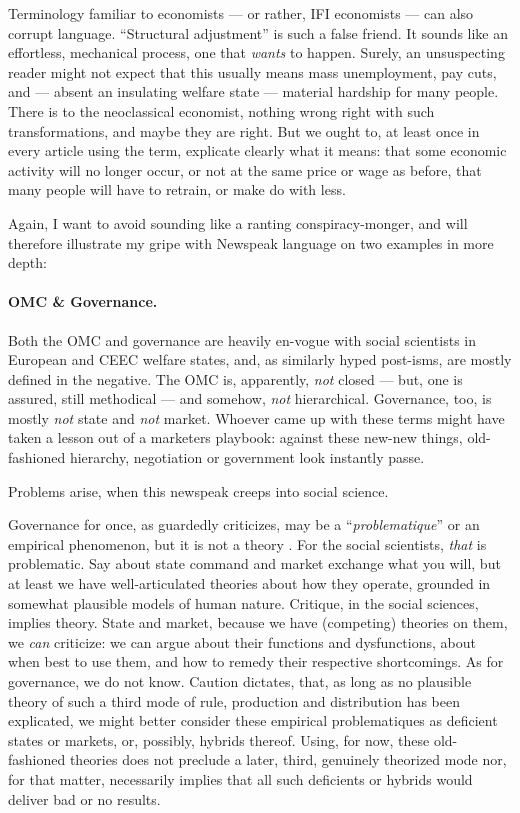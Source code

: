 Terminology familiar to economists --- or rather, \gls{IFI} economists --- can also corrupt language.
``Structural adjustment'' \citep[for example,][19]{Begg2008} is such a false friend.
It sounds like an effortless, mechanical process, one that \emph{wants} to happen.
Surely, an unsuspecting reader might not expect that this usually means mass unemployment, pay cuts, and --- absent an insulating welfare state --- material hardship for many people.
There is to the neoclassical economist, nothing wrong right with such transformations, and maybe they are right.
But we ought to, at least once in every article using the term, explicate clearly what it means:
that some economic activity will no longer occur, or not at the same price or wage as before, that many people will have to retrain, or make do with less.

Again, I want to avoid sounding like a ranting conspiracy-monger, and will therefore illustrate my gripe with Newspeak language on two examples in more depth:

\paragraph{\gls{OMC} \& Governance.} Both the \gls{OMC} and governance are heavily en-vogue with social scientists in European and \gls{CEEC} welfare states, and, as similarly hyped post-isms, are mostly defined in the negative.
The \gls{OMC} is, apparently, \emph{not} closed --- but, one is assured, still methodical --- and somehow, \emph{not} hierarchical.
Governance, too, is mostly \emph{not} state and \emph{not} market.
Whoever came up with these terms might have taken a lesson out of a marketers playbook:
against these new-new things, old-fashioned hierarchy, negotiation or government look instantly passe.

Problems arise, when this newspeak creeps into social science.

Governance for once, as \citeauthor{Jachtenfuchs2001} guardedly criticizes, may be a ``\emph{problematique}'' or an empirical phenomenon, but it is not a theory \citeyearpar[259]{Jachtenfuchs2001}.
For the social scientists, \emph{that} is problematic.
Say about state command and market exchange what you will, but at least we have well-articulated theories about how they operate, grounded in somewhat plausible models of human nature.
Critique, in the social sciences, implies theory.
State and market, because we have (competing) theories on them, we \emph{can} criticize:
we can argue about their functions and dysfunctions, about when best to use them, and how to remedy their respective shortcomings.
As for governance, we do not know.
Caution dictates, that, as long as no plausible theory of such a third mode of rule, production and distribution has been explicated, we might better consider these empirical problematiques as deficient states or markets, or, possibly, hybrids thereof.
Using, for now, these old-fashioned theories does not preclude a later, third, genuinely theorized mode nor, for that matter, necessarily implies that all such deficients or hybrids would deliver bad or no results.

